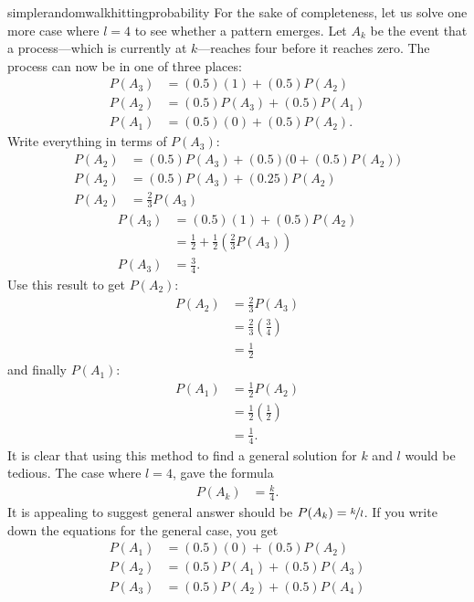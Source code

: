 \begin{answer}{simplerandomwalkhittingprobability}
For the sake of completeness, let us solve one more case where $l=4$ to see whether a pattern emerges.
Let $A_k$ be the event that a process---which is currently at $k$---reaches four before it reaches zero.
The process can now be in one of three places:
\begin{align*}
P(A_3) &= (0.5)(1) + (0.5)P(A_2)  \\
P(A_2) &= (0.5)P(A_3) + (0.5)P(A_1) \\
P(A_1) &= (0.5)(0) + (0.5)P(A_2)
\text{.}
\end{align*}
Write everything in terms of $P(A_3)$:
\begin{align*}
P(A_2) &= (0.5)P(A_3) + (0.5)\Big(0 + (0.5) P(A_2) \Big)  \\
P(A_2) &= (0.5) P(A_3)  + (0.25) P(A_2)  \\
P(A_2) &= \frac{2}{3} P(A_3)
\end{align*}
\begin{align*}
P(A_3) &= (0.5)(1) + (0.5) P(A_2)   \\
       &= \frac{1}{2} + \frac{1}{2}\left(\frac{2}{3}P(A_3)\right)  \\
            P(A_3) &= \frac{3}{4}
\text{.}
\end{align*}
Use this result to get $P(A_2)$:
\begin{align*}
P(A_2) &= \frac{2}{3} P(A_3)  \\
       &= \frac{2}{3}\left(\frac{3}{4}\right) \\
       &= \frac{1}{2}
\end{align*}
and finally $P(A_1)$:
\begin{align*}
P(A_1) &= \frac{1}{2} P(A_2)        \\
       &= \frac{1}{2}\left( \frac{1}{2} \right) \\
       &= \frac{1}{4}
\text{.}
\end{align*}
It is clear that using this method to find a general solution for $k$ and $l$ would be tedious.
The case where $l=4$, gave the formula
\begin{align*}
P(A_k) &= \frac{k}{4}
\text{.}
\end{align*}
It is appealing to suggest general answer should be
$P(A_k) = \nicefrac{k}{l}$.
If you write down the equations for the general case, you get
\begin{align*}
P(A_1) &= (0.5)(0)      + (0.5) P(A_2)  \\
P(A_2) &= (0.5) P(A_1)  + (0.5) P(A_3)  \\
P(A_3) &= (0.5) P(A_2)  + (0.5) P(A_4)  \\

\end{align*}
\end{answer}
